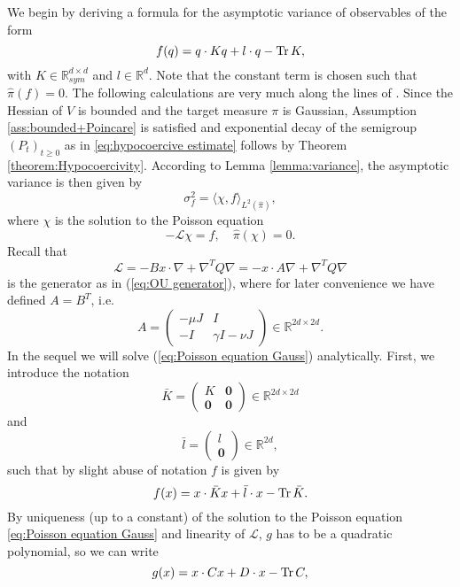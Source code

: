 
We begin by deriving a formula for the asymptotic variance of observables
of the form 
\[
f(q)=q\cdot Kq+l\cdot q-\operatorname{Tr} K,
\]
with $K\in\mathbb{R}_{sym}^{d\times d}$ and $l\in\mathbb{R}^{d}$.
Note that the constant term is chosen such that $\widehat{\pi}(f)=0$.
The following calculations are very much along the lines of \cite[Section  4]{duncan2016variance}. Since the Hessian of $V$ is bounded and the target measure $\pi$ is Gaussian, Assumption \ref{ass:bounded+Poincare} is satisfied and exponential decay of the semigroup $(P_t)_{t\ge0}$ as in \eqref{eq:hypocoercive estimate} follows by  Theorem \ref{theorem:Hypocoercivity}. According to Lemma \ref{lemma:variance}, the
asymptotic variance is then given by 
\begin{equation}
\sigma_{f}^{2}=\langle \chi,f\rangle_{L^{2}(\widehat{\pi})},
\end{equation}
where $\chi$ is the solution to the Poisson equation 
\begin{equation}
\label{eq:Poisson equation Gauss}
-\mathcal{L}\chi=f,\quad\widehat{\pi}(\chi)=0.
\end{equation}
Recall that 
\[
\mathcal{L}=-Bx\cdot\nabla+\nabla^{T}Q\nabla=-x\cdot A\nabla+\nabla^{T}Q\nabla
\]
is the generator as in (\ref{eq:OU generator}), where for later convenience
we have defined $A=B^{T}$, i.e.
\begin{equation}
A=\left(\begin{array}{cc}
-\mu J & I\\
-I & \gamma I -\nu J
\end{array}\right) \in \mathbb{R}^{2d \times 2d}.\label{eq:Amatrix}
\end{equation}
In the sequel we will solve (\ref{eq:Poisson equation Gauss}) analytically.  First, we introduce the notation 
\[
\bar{K}=\left(\begin{array}{cc}
K & \boldsymbol{0}\\
\boldsymbol{0} & \boldsymbol{0}
\end{array}\right)\in\mathbb{R}^{2d\times2d}
\]
and 
\[
\bar{l}=\left(\begin{array}{c}
l\\
\boldsymbol{0}
\end{array}\right)\in\mathbb{R}^{2d},
\]
such that by slight abuse of notation $f$ is given by 
\[
f(x)=x\cdot\bar{K}x+\bar{l}\cdot x-\operatorname{Tr}\bar{K}.
\]
By uniqueness (up to a constant) of the solution to the Poisson equation \eqref{eq:Poisson equation Gauss} and
linearity of $\mathcal{L}$, $g$ has to be a quadratic polynomial,
so we can write 
\[
g(x)=x\cdot Cx+D\cdot x-\operatorname{Tr} C,
\]
